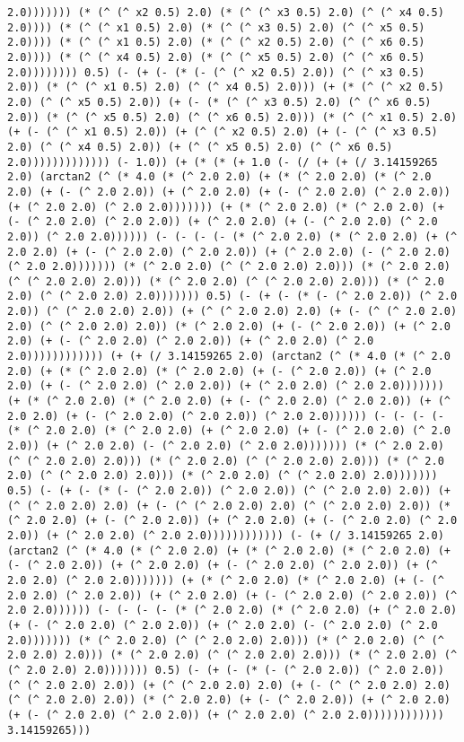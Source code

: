 \begin{lstlisting}
2.0))))))) (* (^ (^ x2 0.5) 2.0) (* (^ (^ x3 0.5) 2.0) (^ (^ x4 0.5) 2.0)))) (* (^ (^ x1 0.5) 2.0) (* (^ (^ x3 0.5) 2.0) (^ (^ x5 0.5) 2.0)))) (* (^ (^ x1 0.5) 2.0) (* (^ (^ x2 0.5) 2.0) (^ (^ x6 0.5) 2.0)))) (* (^ (^ x4 0.5) 2.0) (* (^ (^ x5 0.5) 2.0) (^ (^ x6 0.5) 2.0)))))))) 0.5) (- (+ (- (* (- (^ (^ x2 0.5) 2.0)) (^ (^ x3 0.5) 2.0)) (* (^ (^ x1 0.5) 2.0) (^ (^ x4 0.5) 2.0))) (+ (* (^ (^ x2 0.5) 2.0) (^ (^ x5 0.5) 2.0)) (+ (- (* (^ (^ x3 0.5) 2.0) (^ (^ x6 0.5) 2.0)) (* (^ (^ x5 0.5) 2.0) (^ (^ x6 0.5) 2.0))) (* (^ (^ x1 0.5) 2.0) (+ (- (^ (^ x1 0.5) 2.0)) (+ (^ (^ x2 0.5) 2.0) (+ (- (^ (^ x3 0.5) 2.0) (^ (^ x4 0.5) 2.0)) (+ (^ (^ x5 0.5) 2.0) (^ (^ x6 0.5) 2.0))))))))))))) (- 1.0)) (+ (* (* (+ 1.0 (- (/ (+ (+ (/ 3.14159265 2.0) (arctan2 (^ (* 4.0 (* (^ 2.0 2.0) (+ (* (^ 2.0 2.0) (* (^ 2.0 2.0) (+ (- (^ 2.0 2.0)) (+ (^ 2.0 2.0) (+ (- (^ 2.0 2.0) (^ 2.0 2.0)) (+ (^ 2.0 2.0) (^ 2.0 2.0))))))) (+ (* (^ 2.0 2.0) (* (^ 2.0 2.0) (+ (- (^ 2.0 2.0) (^ 2.0 2.0)) (+ (^ 2.0 2.0) (+ (- (^ 2.0 2.0) (^ 2.0 2.0)) (^ 2.0 2.0)))))) (- (- (- (- (* (^ 2.0 2.0) (* (^ 2.0 2.0) (+ (^ 2.0 2.0) (+ (- (^ 2.0 2.0) (^ 2.0 2.0)) (+ (^ 2.0 2.0) (- (^ 2.0 2.0) (^ 2.0 2.0))))))) (* (^ 2.0 2.0) (^ (^ 2.0 2.0) 2.0))) (* (^ 2.0 2.0) (^ (^ 2.0 2.0) 2.0))) (* (^ 2.0 2.0) (^ (^ 2.0 2.0) 2.0))) (* (^ 2.0 2.0) (^ (^ 2.0 2.0) 2.0))))))) 0.5) (- (+ (- (* (- (^ 2.0 2.0)) (^ 2.0 2.0)) (^ (^ 2.0 2.0) 2.0)) (+ (^ (^ 2.0 2.0) 2.0) (+ (- (^ (^ 2.0 2.0) 2.0) (^ (^ 2.0 2.0) 2.0)) (* (^ 2.0 2.0) (+ (- (^ 2.0 2.0)) (+ (^ 2.0 2.0) (+ (- (^ 2.0 2.0) (^ 2.0 2.0)) (+ (^ 2.0 2.0) (^ 2.0 2.0)))))))))))) (+ (+ (/ 3.14159265 2.0) (arctan2 (^ (* 4.0 (* (^ 2.0 2.0) (+ (* (^ 2.0 2.0) (* (^ 2.0 2.0) (+ (- (^ 2.0 2.0)) (+ (^ 2.0 2.0) (+ (- (^ 2.0 2.0) (^ 2.0 2.0)) (+ (^ 2.0 2.0) (^ 2.0 2.0))))))) (+ (* (^ 2.0 2.0) (* (^ 2.0 2.0) (+ (- (^ 2.0 2.0) (^ 2.0 2.0)) (+ (^ 2.0 2.0) (+ (- (^ 2.0 2.0) (^ 2.0 2.0)) (^ 2.0 2.0)))))) (- (- (- (- (* (^ 2.0 2.0) (* (^ 2.0 2.0) (+ (^ 2.0 2.0) (+ (- (^ 2.0 2.0) (^ 2.0 2.0)) (+ (^ 2.0 2.0) (- (^ 2.0 2.0) (^ 2.0 2.0))))))) (* (^ 2.0 2.0) (^ (^ 2.0 2.0) 2.0))) (* (^ 2.0 2.0) (^ (^ 2.0 2.0) 2.0))) (* (^ 2.0 2.0) (^ (^ 2.0 2.0) 2.0))) (* (^ 2.0 2.0) (^ (^ 2.0 2.0) 2.0))))))) 0.5) (- (+ (- (* (- (^ 2.0 2.0)) (^ 2.0 2.0)) (^ (^ 2.0 2.0) 2.0)) (+ (^ (^ 2.0 2.0) 2.0) (+ (- (^ (^ 2.0 2.0) 2.0) (^ (^ 2.0 2.0) 2.0)) (* (^ 2.0 2.0) (+ (- (^ 2.0 2.0)) (+ (^ 2.0 2.0) (+ (- (^ 2.0 2.0) (^ 2.0 2.0)) (+ (^ 2.0 2.0) (^ 2.0 2.0)))))))))))) (- (+ (/ 3.14159265 2.0) (arctan2 (^ (* 4.0 (* (^ 2.0 2.0) (+ (* (^ 2.0 2.0) (* (^ 2.0 2.0) (+ (- (^ 2.0 2.0)) (+ (^ 2.0 2.0) (+ (- (^ 2.0 2.0) (^ 2.0 2.0)) (+ (^ 2.0 2.0) (^ 2.0 2.0))))))) (+ (* (^ 2.0 2.0) (* (^ 2.0 2.0) (+ (- (^ 2.0 2.0) (^ 2.0 2.0)) (+ (^ 2.0 2.0) (+ (- (^ 2.0 2.0) (^ 2.0 2.0)) (^ 2.0 2.0)))))) (- (- (- (- (* (^ 2.0 2.0) (* (^ 2.0 2.0) (+ (^ 2.0 2.0) (+ (- (^ 2.0 2.0) (^ 2.0 2.0)) (+ (^ 2.0 2.0) (- (^ 2.0 2.0) (^ 2.0 2.0))))))) (* (^ 2.0 2.0) (^ (^ 2.0 2.0) 2.0))) (* (^ 2.0 2.0) (^ (^ 2.0 2.0) 2.0))) (* (^ 2.0 2.0) (^ (^ 2.0 2.0) 2.0))) (* (^ 2.0 2.0) (^ (^ 2.0 2.0) 2.0))))))) 0.5) (- (+ (- (* (- (^ 2.0 2.0)) (^ 2.0 2.0)) (^ (^ 2.0 2.0) 2.0)) (+ (^ (^ 2.0 2.0) 2.0) (+ (- (^ (^ 2.0 2.0) 2.0) (^ (^ 2.0 2.0) 2.0)) (* (^ 2.0 2.0) (+ (- (^ 2.0 2.0)) (+ (^ 2.0 2.0) (+ (- (^ 2.0 2.0) (^ 2.0 2.0)) (+ (^ 2.0 2.0) (^ 2.0 2.0)))))))))))) 3.14159265))) 
\end{lstlisting}
